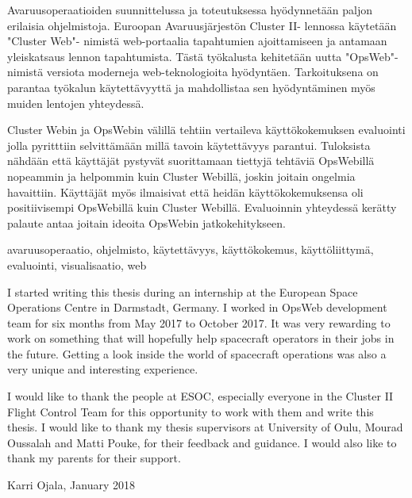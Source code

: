 \documentclass[a4paper, 12pt,titlepage]{dithesis}
\begin{document}
\begin{tiivistelma}
Avaruusoperaatioiden suunnittelussa ja toteutuksessa hyödynnetään paljon erilaisia ohjelmistoja. Euroopan Avaruusjärjestön Cluster II- lennossa käytetään "Cluster Web"- nimistä web-portaalia tapahtumien ajoittamiseen ja antamaan yleiskatsaus lennon tapahtumista. Tästä työkalusta kehitetään uutta "OpsWeb"- nimistä versiota moderneja web-teknologioita hyödyntäen. Tarkoituksena on parantaa työkalun käytettävyyttä ja mahdollistaa sen hyödyntäminen myös muiden lentojen yhteydessä.

Cluster Webin ja OpsWebin välillä tehtiin vertaileva käyttökokemuksen evaluointi jolla pyritttiin selvittämään millä tavoin käytettävyys parantui. Tuloksista nähdään että käyttäjät pystyvät suorittamaan tiettyjä tehtäviä OpsWebillä nopeammin ja helpommin kuin Cluster Webillä, joskin joitain ongelmia havaittiin. Käyttäjät myös ilmaisivat että heidän käyttökokemuksensa oli positiivisempi OpsWebillä kuin Cluster Webillä. Evaluoinnin yhteydessä kerätty palaute antaa joitain ideoita OpsWebin jatkokehitykseen.

\avainsanat avaruusoperaatio, ohjelmisto, käytettävyys, käyttökokemus, käyttöliittymä, evaluointi, visualisaatio, web
\end{tiivistelma}


\sisluettelo

I started writing this thesis during an internship at the European Space Operations Centre in Darmstadt, Germany. I worked in OpsWeb development team for six months from May 2017 to October 2017. It was very rewarding to work on something that will hopefully help spacecraft operators in their jobs in the future. Getting a look inside the world of spacecraft operations was also a very unique and interesting experience.

I would like to thank the people at ESOC, especially everyone in the Cluster II Flight Control Team for this opportunity to work with them and write this thesis. I would like to thank my thesis supervisors at University of Oulu, Mourad Oussalah and Matti Pouke, for their feedback and guidance. I would also like to thank my parents for their support.

Karri Ojala, January 2018


\setlongtables
\begin{longtable}[l]{p{3cm}p{}}



\end{longtable}
\setcounter{table}{0}
\end{document}
